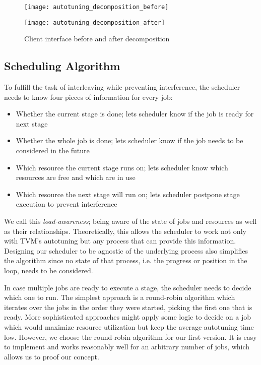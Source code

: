 \begin{figure}
	\begin{minipage}[b]{.5\textwidth}
		\centering\texttt{[image: autotuning\_decomposition\_before]}
		\label{fig:autotuning-decomposition-before}
	\end{minipage}%
	\begin{minipage}[b]{.5\textwidth}
		\centering\texttt{[image: autotuning\_decomposition\_after]}
		\label{fig:autotuning-decomposition-after}
	\end{minipage}
	\caption{Client interface before and after decomposition}
	\label{fig:autotuning-decomposition}
\end{figure}

\subsection{Scheduling Algorithm}
To fulfill the task of interleaving while preventing interference, the scheduler needs to know four pieces of information for every job:
\begin{itemize}
	\item Whether the current stage is done; lets scheduler know if the job is ready for next stage
	\item Whether the whole job is done; lets scheduler know if the job needs to be considered in the future
	\item Which resource the current stage runs on; lets scheduler know which resources are free and which are in use
	\item Which resource the next stage will run on; lets scheduler postpone stage execution to prevent interference
\end{itemize}
We call this \textit{load-awareness}; being aware of the state of jobs and resources as well as their relationships. Theoretically, this allows the scheduler to work not only with TVM's autotuning but any process that can provide this information. Designing our scheduler to be agnostic of the underlying process also simplifies the algorithm since no state of that process, i.e. the progress or position in the loop, needs to be considered.

In case multiple jobs are ready to execute a stage, the scheduler needs to decide which one to run. The simplest approach is a round-robin algorithm which iterates over the jobs in the order they were started, picking the first one that is ready. More sophisticated approaches might apply some logic to decide on a job which would maximize resource utilization but keep the average autotuning time low. However, we choose the round-robin algorithm for our first version. It is easy to implement and works reasonably well for an arbitrary number of jobs, which allows us to proof our concept.

